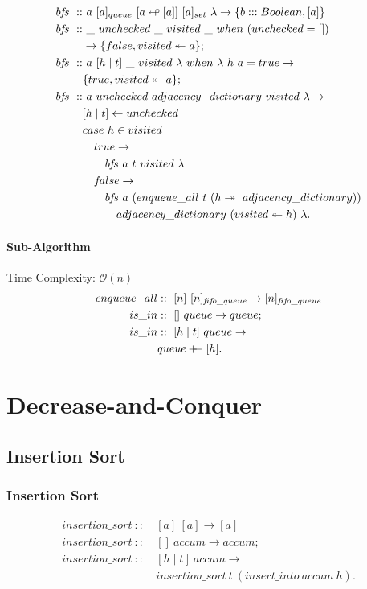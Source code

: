 \documentclass[a4paper,10pt]{book}
\newcommand\doubleplus{+\kern-1.3ex+\kern0.8ex}
\newcommand{\false}{f\kern-0.25ex{alse}}
\newcommand\f{\textit{f}}
\begin{document}
\begin{align*}
b\f s\ ::&\ a\ [a]_{queue}\ [a\looparrowleft [a]]\ [a]_{set}\ \lambda\rightarrow \{b:::Boolean,[a]\}\\
b\f s\ ::&\ \_\ unchecked\ \_\ visited\ \_\  when\ (unchecked=[])\\ 
	&\rightarrow \{false,visited\twoheadleftarrow a\};\\
b\f s\ ::&\ a\ [h\mid t]\ \_\ visited\ \lambda\ when\ \lambda\ h\ a=true\rightarrow\\
	&\{true,visited\twoheadleftarrow a\};\\
b\f s\ ::&\ a\ unchecked\ adjacency\_dictionary\ visited\ \lambda\rightarrow\\
	&[h\mid t]\leftarrow unchecked\\
	&case\ h\in visited\\
	&\quad true\rightarrow\\
	&\qquad b\f s \ a\ t\ visited\ \lambda\\
	&\quad\false\rightarrow\\
	&\qquad b\f s \ a\ (enqueue\_all\ t\ (h\twoheadrightarrow\ adjacency\_dictionary))\\
	&\qquad\quad adjacency\_dictionary\ (visited\twoheadleftarrow h)\ \lambda.
\end{align*}
\subsubsection{Sub-Algorithm}Time Complexity: $\mathcal{O}(n)$
\begin{align*}
enqueue\_all &::\ [n]\ [n]_{\f i\f o\_queue}\rightarrow [n]_{\f i\f o\_queue}\\
is\_in &::\ []\ queue \rightarrow queue;\\
is\_in &::\ [h\mid t]\ queue\rightarrow\\
       &queue\doubleplus [h].
\end{align*}

\chapter{Decrease-and-Conquer}

\section{Insertion Sort}

\subsection{Insertion Sort}
\begin{align*}
insertion\_sort\ ::\ &[a]\ [a]\rightarrow [a]\\
insertion\_sort\ ::\ &[]\ accum\rightarrow accum;\\
insertion\_sort\ ::\ &[h\mid t]\ accum\rightarrow \\
	&insertion\_sort\ t\ (insert\_into\ accum\ h).
\end{align*}
\end{document}
